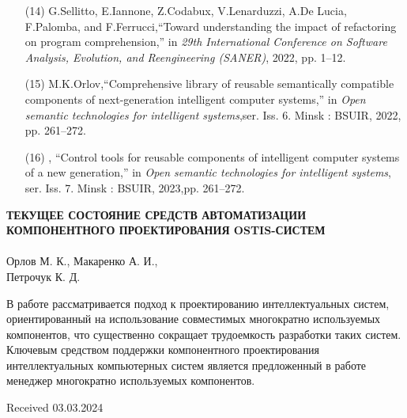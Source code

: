 \documentclass[10pt, a4paper]{article}
\begin{document}
\begin{multicols}
\begin{enumerate}
\item[(14)] G.Sellitto, E.Iannone, Z.Codabux, V.Lenarduzzi, A.De Lucia, F.Palomba, and F.Ferrucci,“Toward understanding the impact of refactoring on program comprehension,” in \textit{ 29th International Conference on Software Analysis, Evolution, and Reengineering (SANER)}, 2022, pp. 1–12.
\item[(15)] M.K.Orlov,“Comprehensive library of reusable semantically compatible components of next-generation intelligent computer systems,” in \textit{Open semantic technologies for intelligent systems},ser. Iss. 6. Minsk : BSUIR, 2022, pp. 261–272.
\item[(16)]  \textendash \textendash, “Control tools for reusable components of intelligent computer systems of a new generation,” in \textit{Open semantic technologies for intelligent systems}, ser. Iss. 7. Minsk : BSUIR, 2023,pp. 261–272.
\end{enumerate}
\small
\begin{center}
\large\textbf{
ТЕКУЩЕЕ СОСТОЯНИЕ СРЕДСТВ АВТОМАТИЗАЦИИ КОМПОНЕНТНОГО ПРОЕКТИРОВАНИЯ OSTIS-СИСТЕМ}   
\normalsize
\\ \\Орлов М. К., Макаренко А. И.,\\Петрочук К. Д.
\end{center}
\normalsize
В работе рассматривается подход к проектированию интеллектуальных систем, ориентированный на использование совместимых 
\vspace{0.4}многократно используемых компонентов, что существенно сокращает трудоемкость разработки таких систем. Ключевым средством поддержки компонентного проектирования интеллектуальных компьютерных систем является предложенный в работе менеджер многократно используемых компонентов.
\begin{flushright}
Received 03.03.2024   
\end{flushright}
\end{multicols}
\end{document}
